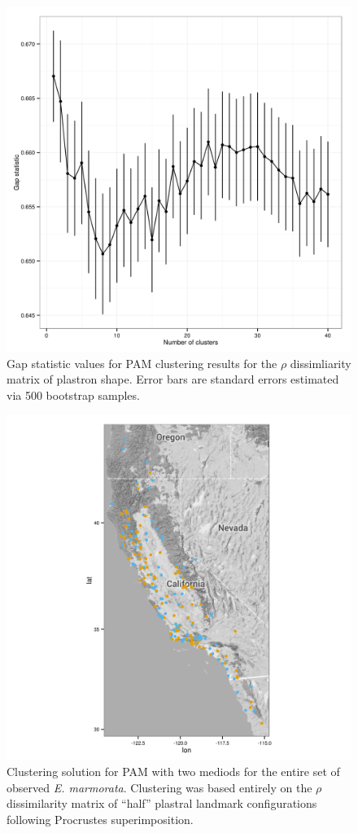 \documentclass[12pt,letterpaper]{article}\usepackage{graphicx, color}
\begin{document}
\begin{figure}[ht]
  \centering
  \includegraphics[width = \textwidth]{figure/gap_res}
  \caption{Gap statistic values for PAM clustering results for the \(\rho\) dissimliarity matrix of plastron shape. Error bars are standard errors estimated via 500 bootstrap samples.}
  \label{fig:gap}
\end{figure}

\begin{figure}[ht]
  \centering
  \includegraphics{figure/gap_map}
  \caption{Clustering solution for PAM with two mediods for the entire set of observed \textit{E. marmorata}. Clustering was based entirely on the \(\rho\) dissimilarity matrix of ``half'' plastral landmark configurations following Procrustes superimposition.}
  \label{fig:gap_map}
\end{figure}
\end{document}
